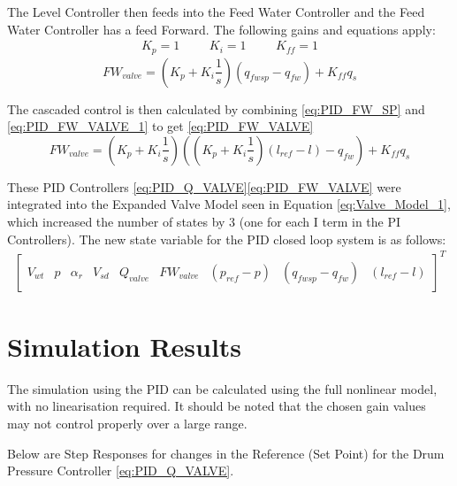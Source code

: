     The Level Controller then feeds into the Feed Water Controller and the Feed Water Controller has a feed Forward. The following gains and equations apply:
    $$ \begin{matrix} K_p = 1 & & & K_i = 1  & & & K_{ff} = 1\end{matrix}$$
    \begin{equation}
        \label{eq:PID_FW_VALVE_1}
        FW_{valve} = \left( K_p + K_i \frac{1}{s} \right)\left( q_{fwsp} - q_{fw} \right) + K_{ff} q_s
    \end{equation}
    
    The cascaded control is then calculated by combining \eqref{eq:PID_FW_SP} and \eqref{eq:PID_FW_VALVE_1} to get \eqref{eq:PID_FW_VALVE}
    \begin{equation}
        \label{eq:PID_FW_VALVE}
        FW_{valve} = \left( K_p + K_i \frac{1}{s} \right)\left( \left( K_p + K_i \frac{1}{s} \right)\left( l_{ref} - l \right) - q_{fw} \right) + K_{ff} q_s
    \end{equation}
    
    These PID Controllers \eqref{eq:PID_Q_VALVE}\eqref{eq:PID_FW_VALVE} were integrated into the Expanded Valve Model seen in Equation \ref{eq:Valve_Model_1}, which increased the number of states by 3 (one for each I term in the PI Controllers). 
    The new state variable for the PID closed loop system is as follows:
    $$\begin{matrix} \left [ \begin{matrix} V_{wt} & p & \alpha_r & V_{sd} & Q_{valve} & FW_{valve} & \left( p_{ref} - p \right) & \left( q_{fwsp} - q_{fw} \right) & \left( l_{ref} - l \right) \end{matrix} \right ]^T \end{matrix}$$

\section{Simulation Results}

    The simulation using the PID can be calculated using the full nonlinear model, with no linearisation required. It should be noted that the chosen gain values may not control properly over a large range. 
    
    Below are Step Responses for changes in the Reference (Set Point) for the Drum Pressure Controller \eqref{eq:PID_Q_VALVE}.
    
